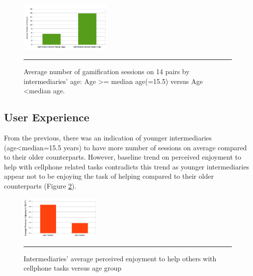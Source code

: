 \documentclass{sig-alternate}
\begin{document}
\begin{figure}[htbp]
  \centering
    \includegraphics[width=0.4\textwidth]{gambyage.png}
    \rule{26em}{0.5pt}
  \caption{Average number of gamification sessions on  14 pairs by intermediaries' age: Age \textgreater= median age(=15.5) versus Age \textless median age.}
  \label{figure:gambyage}
\end{figure}\newline
\subsection{User Experience}
From the previous, there was an indication of younger intermediaries (age\textless median=15.5 years) to have more number of sessions on average compared to their older counterparts. However, baseline trend on perceived enjoyment to help with cellphone related tasks contradicts this trend as younger intermediaries appear not to be enjoying the task of helping compared to their older counterparts (Figure \ref{figure:PE_HELP_Age}).\newline
\begin{figure}[htbp]
  \centering
    \includegraphics[width=0.35\textwidth]{PE_HELP_Age.png}
    \rule{26em}{0.5pt}
  \caption{Intermediaries' average perceived enjoyment to help others with cellphone tasks versus age group}
  \label{figure:PE_HELP_Age}
\end{figure}
\end{document}

